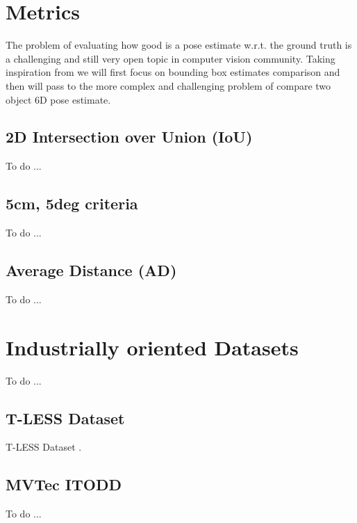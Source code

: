 \section{Metrics}\label{sec:metrics}
The problem of evaluating how good is a pose estimate w.r.t. the ground truth is a challenging and still very open topic in computer vision community.  Taking inspiration from \cite{hodan20166DPoseEstimation} we will first focus on bounding box estimates comparison and then will pass to the more complex and challenging problem of compare two object 6D pose estimate.

\subsection{2D Intersection over Union (IoU)}\label{subsec:iou}
To do ...

\subsection{5cm, 5deg criteria}\label{subsec:5cm5deg}
To do ...

\subsection{Average Distance (AD)}\label{subsec:average_distance}
To do ...

\section{Industrially oriented Datasets}\label{sec:datasets}
To do ...

\subsection{T-LESS Dataset}\label{subsec:tless_dataset}
T-LESS Dataset \cite{hodan2017tless}.

\subsection{MVTec ITODD}\label{subsec:mvtex_itodd}
To do ...